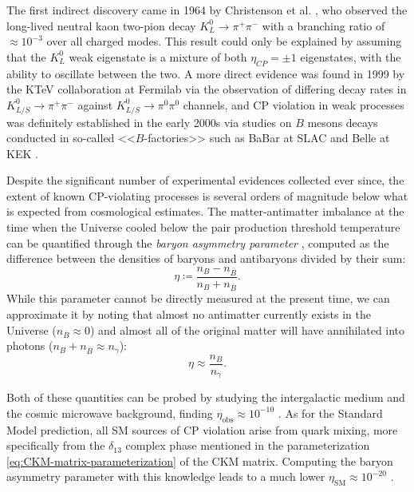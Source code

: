 The first indirect discovery came in 1964 by Christenson et al. \cite{kaoncpv}, who observed the long-lived neutral kaon two-pion decay $K_L^0 \rightarrow \pi^+ \pi^-$ with a branching ratio of $\approx {10}^{-3}$ over all charged modes.
This result could only be explained by assuming that the $K_L^0$ weak eigenstate is a mixture of both $\eta_{CP}=\pm1$ eigenstates, with the ability to oscillate between the two.
A more direct evidence was found in 1999 by the KTeV collaboration at Fermilab \cite{ktevcpv} via the observation of differing decay rates in $K_{L/S}^0 \rightarrow \pi^+ \pi^-$ against $K_{L/S}^0 \rightarrow \pi^0 \pi^0$ channels, and CP violation in weak processes was definitely established in the early 2000s via studies on $B$ mesons decays conducted in so-called <<$B$-factories>> such as BaBar at SLAC \cite{babarcpv} and Belle at KEK \cite{bellecpv}.

Despite the significant number of experimental evidences collected ever since, the extent of known CP-violating processes is several orders of magnitude below what is expected from cosmological estimates.
The matter-antimatter imbalance at the time when the Universe cooled below the pair production threshold temperature can be quantified through the \textit{baryon asymmetry parameter} \cite{Canetti2012}, computed as the difference between the densities of baryons and antibaryons divided by their sum:
\begin{equation}
\eta \coloneqq \frac{n_B - n_{\bar{B}}}{n_B + n_{\bar{B}}}.
\end{equation}
While this parameter cannot be directly measured at the present time, we can approximate it by noting that almost no antimatter currently exists in the Universe ($n_{\bar{B}} \approx 0$) and almost all of the original matter will have annihilated into photons ($n_B + n_{\bar{B}} \approx n_\gamma$):
\begin{equation}
\eta \approx \frac{n_B}{n_\gamma}.
\end{equation}

Both of these quantities can be probed by studying the intergalactic medium and the cosmic microwave background, finding  $\eta_\text{obs} \approx {10}^{-10}$ \cite{Steigman2007}.
As for the Standard Model prediction, all SM sources of CP violation arise from quark mixing, more specifically from the $\delta_{13}$ complex phase mentioned in the parameterization \eqref{eq:CKM-matrix-parameterization} of the CKM matrix.
Computing the baryon asymmetry parameter with this knowledge leads to a much lower $\eta_\text{SM} \approx {10}^{-20}$ \cite{Canetti2012}.

